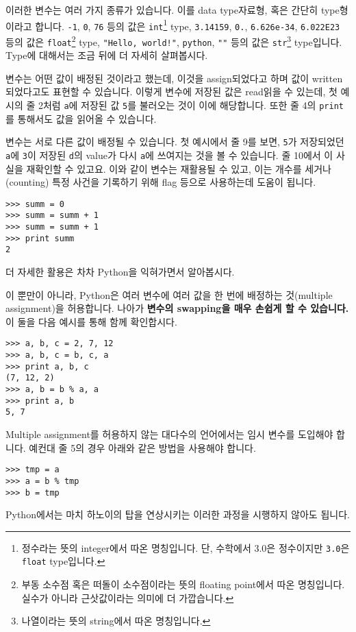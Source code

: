 \documentclass[../main.tex]{subfiles}
\begin{document}
이러한 변수는 여러 가지 종류가 있습니다.
이를 data type자료형, 혹은 간단히 type형이라고 합니다.
\texttt{-1}, \texttt{0}, \texttt{76} 등의 값은 \texttt{int}\footnote{정수라는 뜻의 integer에서 따온 명칭입니다. 단, 수학에서 3.0은 정수이지만 \texttt{3.0}은 \texttt{float} type입니다.} type, \texttt{3.14159}, \texttt{0.}, \texttt{6.626e-34}, \texttt{6.022E23} 등의 값은 \texttt{float}\footnote{부동 소수점 혹은 떠돌이 소수점이라는 뜻의 floating point에서 따온 명칭입니다. 실수가 아니라 근삿값이라는 의미에 더 가깝습니다.} type, \texttt{"Hello, world!"}, \texttt{\textquotesingle python\textquotesingle}, \texttt{""} 등의 값은 \texttt{str}\footnote{나열이라는 뜻의 string에서 따온 명칭입니다.} type입니다.
Type에 대해서는 조금 뒤에 더 자세히 살펴봅시다.

변수는 어떤 값이 배정된 것이라고 했는데, 이것을 assign되었다고 하며 값이 written되었다고도 표현할 수 있습니다.
이렇게 변수에 저장된 값은 read읽을 수 있는데, 첫 예시의 줄 2처럼 \texttt{a}에 저장된 값 \texttt{5}를 불러오는 것이 이에 해당합니다.
또한 줄 4의 \texttt{print}를 통해서도 값을 읽어올 수 있습니다.

변수는 서로 다른 값이 배정될 수 있습니다.
첫 예시에서 줄 9를 보면, \texttt{5}가 저장되었던 \texttt{a}에 \texttt{3}이 저장된 \texttt{d}의 value가 다시 \texttt{a}에 쓰여지는 것을 볼 수 있습니다.
줄 10에서 이 사실을 재확인할 수 있고요.
이와 같이 변수는 재활용될 수 있고, 이는 개수를 세거나(counting) 특정 사건을 기록하기 위해 flag 등으로 사용하는데 도움이 됩니다.
\begin{verbatim}
>>> summ = 0
>>> summ = summ + 1
>>> summ = summ + 1
>>> print summ
2
\end{verbatim}
더 자세한 활용은 차차 Python을 익혀가면서 알아봅시다.

이 뿐만이 아니라, Python은 여러 변수에 여러 값을 한 번에 배정하는 것(multiple assignment)을 허용합니다.
나아가 \textbf{변수의 swapping을 매우 손쉽게 할 수 있습니다.}
이 둘을 다음 예시를 통해 함께 확인합시다.
\begin{verbatim}
>>> a, b, c = 2, 7, 12
>>> a, b, c = b, c, a
>>> print a, b, c
(7, 12, 2)
>>> a, b = b % a, a
>>> print a, b
5, 7
\end{verbatim}
Multiple assignment를 허용하지 않는 대다수의 언어에서는 임시 변수를 도입해야 합니다.
예컨대 줄 5의 경우 아래와 같은 방법을 사용해야 합니다.
\begin{verbatim}
>>> tmp = a
>>> a = b % tmp
>>> b = tmp
\end{verbatim}
Python에서는 마치 하노이의 탑을 연상시키는 이러한 과정을 시행하지 않아도 됩니다.
\end{document}
